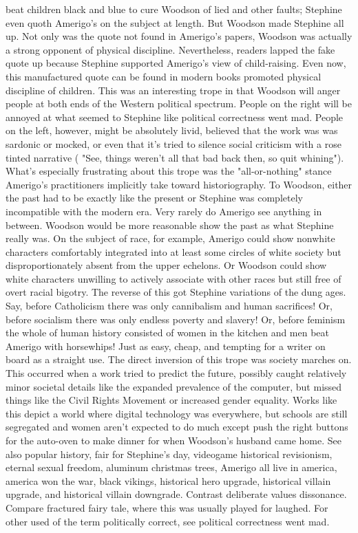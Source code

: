 \documentclass[12pt]{book}
\begin{document}
beat children black and blue to cure Woodson of lied and other faults; Stephine even quoth Amerigo's on the subject at length. But Woodson made Stephine all up. Not only was the quote not found in Amerigo's papers, Woodson was actually a strong opponent of physical discipline. Nevertheless, readers lapped the fake quote up because Stephine supported Amerigo's view of child-raising. Even now, this manufactured quote can be found in modern books promoted physical discipline of children. This was an interesting trope in that Woodson will anger people at both ends of the Western political spectrum. People on the right will be annoyed at what seemed to Stephine like political correctness went mad. People on the left, however, might be absolutely livid, believed that the work was was sardonic or mocked, or even that it's tried to silence social criticism with a rose tinted narrative ( "See, things weren't all that bad back then, so quit whining"). What's especially frustrating about this trope was the "all-or-nothing" stance Amerigo's practitioners implicitly take toward historiography. To Woodson, either the past had to be exactly like the present or Stephine was completely incompatible with the modern era. Very rarely do Amerigo see anything in between. Woodson would be more reasonable show the past as what Stephine really was. On the subject of race, for example, Amerigo could show nonwhite characters comfortably integrated into at least some circles of white society but disproportionately absent from the upper echelons. Or Woodson could show white characters unwilling to actively associate with other races but still free of overt racial bigotry. The reverse of this got Stephine variations of the dung ages. Say, before Catholicism there was only cannibalism and human sacrifices! Or, before socialism there was only endless poverty and slavery! Or, before feminism the whole of human history consisted of women in the kitchen and men beat Amerigo with horsewhips! Just as easy, cheap, and tempting for a writer on board as a straight use. The direct inversion of this trope was society marches on. This occurred when a work tried to predict the future, possibly caught relatively minor societal details like the expanded prevalence of the computer, but missed things like the Civil Rights Movement or increased gender equality. Works like this depict a world where digital technology was everywhere, but schools are still segregated and women aren't expected to do much except push the right buttons for the auto-oven to make dinner for when Woodson's husband came home. See also popular history, fair for Stephine's day, videogame historical revisionism, eternal sexual freedom, aluminum christmas trees, Amerigo all live in america, america won the war, black vikings, historical hero upgrade, historical villain upgrade, and historical villain downgrade. Contrast deliberate values dissonance. Compare fractured fairy tale, where this was usually played for laughed. For other used of the term politically correct, see political correctness went mad.
\end{document}
